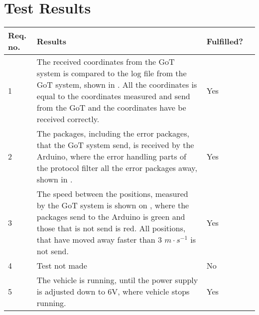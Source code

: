 \section{Test Results}\label{cha:TestProcedure}

\begin{table}[H] \centering
\begin{tabular}{|p{1cm}|p{10cm}|p{2cm}|p{3cm}|}
\hline%
\textbf{Req. no.}  &  \textbf{Results} &  \textbf{Fulfilled?}         \\
\hline%
           1    &   The received coordinates from the GoT system is compared to the log file from the GoT system, shown in \tableref{}. All the coordinates is equal to the coordinates measured and send from the GoT and the coordinates have be received correctly.    &   Yes               \\
\hline%
           2    &   The packages, including the error packages, that the GoT system send, is received by the Arduino, where the error handling parts of the protocol filter all the error packages away, shown in \tableref{}.   &  Yes                \\
\hline%
           3    &   The speed between the positions, measured by the GoT system is shown on \figref {}, where the packages send to the Arduino is green and those that is not send is red. All positions, that have moved away faster than 3 $m \cdot s^{-1}$ is not send.   &  Yes            \\
\hline%
           4    &   Test not made   &   No                \\
\hline%
           5    &   The vehicle is running, until the power supply is adjusted down to 6V, where vehicle stops running. &   Yes              \\
\hline%

\end{tabular}
\end{table}

